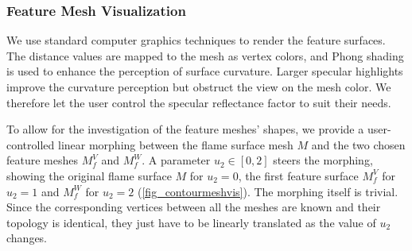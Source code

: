 \subsubsection{Feature Mesh Visualization}
%
We use standard computer graphics techniques to render the feature surfaces.
%
The distance values are mapped to the mesh as vertex colors, and Phong shading
is used to enhance the perception of surface curvature.
%
Larger specular highlights improve the curvature perception but obstruct the
view on the mesh color. We therefore let the user control the specular
reflectance factor to suit their needs.
%

%
To allow for the investigation of the feature meshes' shapes, we provide a
user-controlled linear morphing between the flame surface mesh $M$ and the two
chosen feature meshes $M^{V}_{f}$ and $M^{W}_{f}$.
%
A parameter $u_2 \in [0, 2]$ steers the morphing, showing the original flame
surface $M$ for $u_2 = \num{0}$, the first feature surface $M^{V}_{f}$ for $u_2
= \num{1}$ and $M^{W}_{f}$ for $u_2 = \num{2}$ (\cref{fig_contourmeshvis}).
%
The morphing itself is trivial.
%
Since the corresponding vertices between all the meshes are known
and their topology is identical, they just have to be linearly translated as the
value of $u_2$ changes.
%

